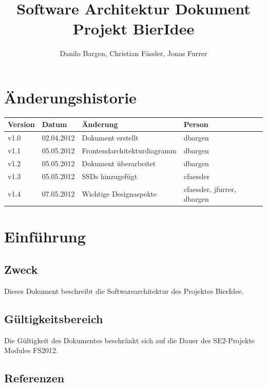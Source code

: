 \documentclass[10pt,a4paper]{scrartcl}
\author{Danilo Bargen, Christian Fässler, Jonas Furrer}
\title{Software Architektur Dokument\\ Projekt BierIdee}
\begin{document}
\begin{titlepage}
	\maketitle
	\vspace{120mm}
	\thispagestyle{empty} %
\end{titlepage}

\tableofcontents
\newpage

\section*{Änderungshistorie}
\begin{tabular}{p{}p{}p{}p{}}
\toprule
\textbf{Version} & \textbf{Datum} & \textbf{Änderung} & \textbf{Person} \\  
\midrule
v1.0 & 02.04.2012 & Dokument erstellt & dbargen \\  
\hline 
v1.1 & 05.05.2012 & Frontendarchitekturdiagramm & dbargen \\  
\hline 
v1.2 & 05.05.2012 & Dokument überarbeitet & dbargen \\  
\hline 
v1.3 & 05.05.2012 & SSDs hinzugefügt & cfaessler \\  
\hline 
v1.4 & 07.05.2012 & Wichtige Designaspekte & cfaessler, jfurrer, dbargen \\  
\bottomrule
\end{tabular} 
\newpage

\section{Einführung}

\subsection{Zweck}
Dieses Dokument beschreibt die Softwarearchitektur des Projektes BierIdee.

\subsection{Gültigkeitsbereich}
Die Gültigkeit des Dokumentes beschränkt sich auf die Dauer des SE2-Projekte Modules FS2012.

\subsection{Referenzen}
\end{document}
